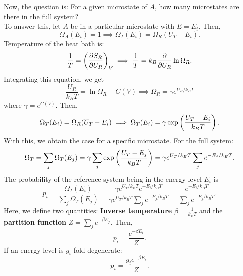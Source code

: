 Now, the question is: For a given microstate of $A$, how many microstates are there in the full system?\\
To answer this, let $A$ be in a particular microstate with $E=E_i$. Then,
\begin{equation}
    \Omega_A(E_i)=1\implies\Omega_T(E_i)=\Omega_R(U_T-E_i).
\end{equation}
Temperature of the heat bath is:
\begin{equation}
    \frac{1}{T}=\left( \frac{\partial S_R}{\partial U_R} \right)_V\implies\frac{1}{T}=k_B\frac{\partial }{\partial U_R}\ln\Omega_R.
\end{equation}
Integrating this equation, we get
\begin{equation}
    \frac{U_R}{k_BT}=\ln\Omega_R+C(V)\implies\Omega_R=\gamma e^{U_R/k_BT}
\end{equation}
where $\gamma=e^{C(V)}$. Then,
\begin{equation}
    \Omega_T(E_i)=\Omega_R(U_T-E_i)\implies\Omega_T(E_i)=\gamma\exp\left( \frac{U_T-E_i}{k_BT} \right).
\end{equation}
With this, we obtain the case for a specific microstate. For the full system:
\begin{equation}
    \Omega_T=\sum_j\Omega_T(E_j)=\gamma\sum_j\exp\left( \frac{U_T-E_j}{k_BT} \right)=\gamma e^{U_T/k_BT}\sum_je^{-E_j/k_BT}.
\end{equation}
The probability of the reference system being in the energy level $E_i$ is
\begin{equation}
    p_i=\frac{\Omega_T(E_i)}{\sum_j\Omega_T(E_j)}=\frac{\gamma e^{U_T/k_BT}e^{-E_i/k_BT}}{\gamma e^{U_T/k_BT}\sum_je^{-E_j/k_BT}}=\frac{e^{-E_i/k_BT}}{\sum_je^{-E_j/k_BT}}.
\end{equation}
Here, we define two quantities: \textbf{Inverse temperature} $\beta=\frac{1}{k_BT}$ and the \textbf{partition function} $Z=\sum_je^{-\beta E_j}$. Then,
\begin{equation}
    p_i = \frac{e^{-\beta E_i}}{Z}.
\end{equation}
If an energy level is $g_i$-fold degenerate: 
\begin{equation}
    p_i=\frac{g_ie^{-\beta E_i}}{Z}.
\end{equation}
